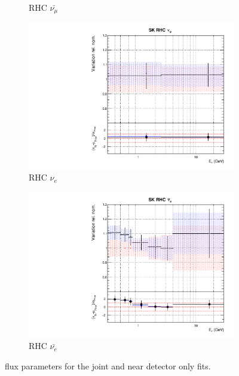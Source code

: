 \begin{figure}[!htbp]
\begin{subfigure}{0.45\textwidth}
  \caption{\SK RHC $\bar{\nu_{\mu}}$}
\end{subfigure}
\begin{subfigure}{0.45\textwidth}
  \centering
  \includegraphics[width=0.75\linewidth]{figs/jointflux14}
  \caption{\SK RHC $\nu_{e}$}
\end{subfigure}
\begin{subfigure}{0.45\textwidth}
  \centering
  \includegraphics[width=0.75\linewidth]{figs/jointflux15}
  \caption{\SK RHC $\bar{\nu_e}$}
\end{subfigure}
\caption{\SK flux parameters for the joint and near detector only fits.}
\label{fig:jointfluxSKapp}
\end{figure}


